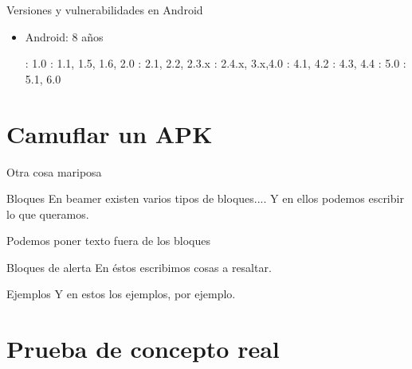 \documentclass{beamer}
\begin{document}
\begin{frame}{Versiones y vulnerabilidades en Android}
	
	\begin{itemize}[<+-|alert@+>]
		
		\item Android: 8 años
			\begin{itemize}
				: 1.0 \newline
				: 1.1, 1.5, 1.6, 2.0 \newline
				: 2.1, 2.2, 2.3.x \newline
				: 2.4.x, 3.x,4.0 \newline
				: 4.1, 4.2 \newline
				: 4.3, 4.4 \newline
				: 5.0 \newline
				: 5.1, 6.0 \newline
			\end{itemize}

	\end{itemize}
	
\end{frame}

\section{Camuflar un APK}

\begin{frame}{Otra cosa mariposa}
\begin{block}{Bloques}
En beamer existen varios tipos de bloques....
Y en ellos podemos escribir lo que queramos.
\end{block}

Podemos poner texto fuera de los bloques

\begin{alertblock}{Bloques de alerta}
En éstos escribimos cosas a resaltar.
\end{alertblock}

\begin{exampleblock}{Ejemplos}
Y en estos los ejemplos, por ejemplo.
\end{exampleblock}

\end{frame}

\section{Prueba de concepto real}
\end{document}
